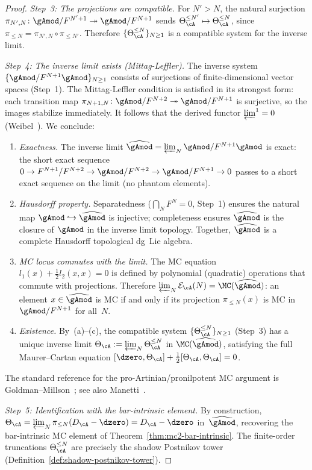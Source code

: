 \begin{proof}
\smallskip\noindent
\emph{Step~3: The projections are compatible.}
For $N' > N$, the natural surjection
$\pi_{N',N}\colon \gAmod/F^{N'+1} \twoheadrightarrow
\gAmod/F^{N+1}$
sends $\Theta_\cA^{\leq N'} \mapsto \Theta_\cA^{\leq N}$,
since $\pi_{\leq N} = \pi_{N',N} \circ \pi_{\leq N'}$.
Therefore
$\{\Theta_\cA^{\leq N}\}_{N \geq 1}$
is a compatible system for the inverse limit.

\smallskip\noindent
\emph{Step~4: The inverse limit exists (Mittag-Leffler).}
The inverse system
$\{\gAmod/F^{N+1}\gAmod\}_{N \geq 1}$
consists of surjections of finite-dimensional vector spaces
(Step~1).  The Mittag-Leffler condition is
satisfied in its strongest form: each transition map
$\pi_{N+1,N}\colon \gAmod/F^{N+2} \twoheadrightarrow
\gAmod/F^{N+1}$ is surjective, so the images stabilize
immediately.  It follows that the derived functor
$\varprojlim^1 = 0$ (Weibel~\cite[\S3.5]{Weibel94}).
We conclude:
\begin{enumerate}[label=\textup{(\alph*)}]
\item \emph{Exactness.}
  The inverse limit
  $\widehat{\gAmod}
  = \varprojlim_N \gAmod/F^{N+1}\gAmod$
  is exact: the short exact sequence
  $0 \to F^{N+1}/F^{N+2} \to \gAmod/F^{N+2} \to
  \gAmod/F^{N+1} \to 0$
  passes to a short exact sequence on the limit
  (no phantom elements).
\item \emph{Hausdorff property.}
  Separatedness ($\bigcap_N F^N = 0$, Step~1)
  ensures the natural map
  $\gAmod \hookrightarrow \widehat{\gAmod}$ is injective;
  completeness ensures $\widehat{\gAmod}$ is the closure
  of $\gAmod$ in the inverse limit topology.
  Together, $\widehat{\gAmod}$ is a complete Hausdorff
  topological dg~Lie algebra.
\item \emph{MC locus commutes with the limit.}
  The MC equation $l_1(x) + \tfrac{1}{2}l_2(x,x) = 0$ is
  defined by polynomial (quadratic) operations that commute
  with projections.  Therefore
  $\varprojlim_N \mathcal{E}_\cA(N)
  = \MC(\widehat{\gAmod})$:
  an element $x \in \widehat{\gAmod}$ is MC if and only if
  its projection $\pi_{\leq N}(x)$ is MC in
  $\gAmod/F^{N+1}$ for all~$N$.
\item \emph{Existence.}
  By~(a)--(c), the compatible system
  $\{\Theta_\cA^{\leq N}\}_{N \geq 1}$ (Step~3) has a
  unique inverse limit
  $\Theta_\cA := \varprojlim_N \Theta_\cA^{\leq N}$
  in $\MC(\widehat{\gAmod})$, satisfying
  the full Maurer--Cartan equation
  $[\dzero, \Theta_\cA]
  + \tfrac{1}{2}[\Theta_\cA, \Theta_\cA] = 0$.
\end{enumerate}
The standard reference for the pro-Artinian/pronilpotent MC
argument is Goldman--Millson~\cite{GoldmanMillson88};
see also Manetti~\cite{Manetti04a}.

\smallskip\noindent
\emph{Step~5: Identification with the bar-intrinsic element.}
By construction, $\Theta_\cA = \varprojlim_N \pi_{\leq N}
(D_\cA - \dzero) = D_\cA - \dzero$ in~$\widehat{\gAmod}$,
recovering the bar-intrinsic MC element of
Theorem~\ref{thm:mc2-bar-intrinsic}.
The finite-order truncations $\Theta_\cA^{\leq N}$ are
precisely the shadow Postnikov tower
(Definition~\ref{def:shadow-postnikov-tower}).
\end{proof}

